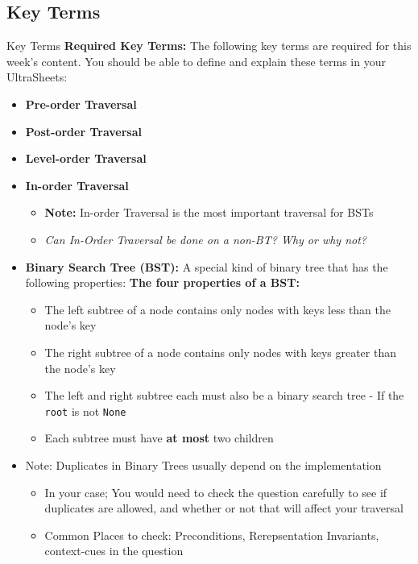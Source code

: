 \documentclass[hyperref={colorlinks,citecolor=blue,linkcolor=blue,urlcolor=blue}, aspectratio=1610]{beamer}
\begin{document}
\subsection{Key Terms}
\begin{frame}{Key Terms}
  \textbf{Required Key Terms:} The following key terms are required for this week's content. You should be able to define and explain these terms in your UltraSheets\texttrademark{}:
  \begin{itemize}
    \item \textbf{Pre-order Traversal}
    \item \textbf{Post-order Traversal} 
    \item \textbf{Level-order Traversal} 
    \item \textbf{In-order Traversal} 
    \begin{itemize}
      \item \textbf{Note:} In-order Traversal is the most important traversal for BSTs
      \item \textit{Can In-Order Traversal be done on a non-BT? Why or why not?}
    \end{itemize}
    \item \textbf{Binary Search Tree (BST):} A special kind of binary tree that has the following properties:
    \textbf{The four properties of a BST:}
    \begin{itemize}
      \item The left subtree of a node contains only nodes with keys less than the node's key
      \item The right subtree of a node contains only nodes with keys greater than the node's key
      \item The left and right subtree each must also be a binary search tree - If the \texttt{root} is not \texttt{None}
      \item Each subtree must have \textbf{at most} two children
    \end{itemize}
    \item Note: Duplicates in Binary Trees usually depend on the implementation
    \begin{itemize}
      \item In your case; You would need to check the question carefully to see if duplicates are allowed, and whether or not that will affect your traversal
      \item Common Places to check: Preconditions, Rerepsentation Invariants, context-cues in the question
    \end{itemize}
  \end{itemize}
\end{frame}
\end{document}
